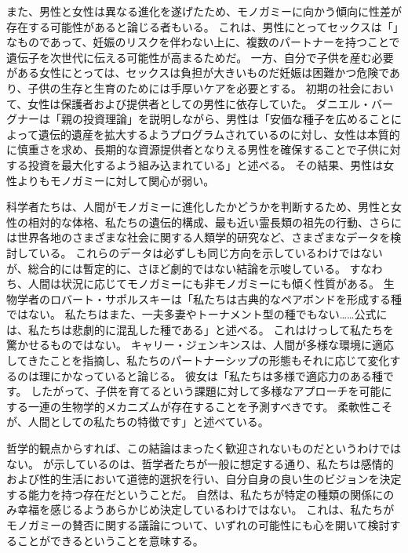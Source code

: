 \documentclass[paper=a4,book,openany]{jlreq} \usepackage{mystyle}
\begin{document}
また、男性と女性は異なる進化を遂げたため、モノガミーに向かう傾向に性差が存在する可能性があると論じる者もいる。
これは、男性にとってセックスは「」なものであって、妊娠のリスクを伴わない上に、複数のパートナーを持つことで遺伝子を次世代に伝える可能性が高まるためだ。
一方、自分で子供を産む必要がある女性にとっては、セックスは負担が大きいものだ{\DDASH}妊娠は困難かつ危険であり、子供の生存と生育のためには手厚いケアを必要とする。
初期の社会において、女性は保護者および提供者としての男性に依存していた。
ダニエル・バーグナーは「親の投資理論」を説明しながら、男性は「安価な種子を広めることによって遺伝的遺産を拡大するようプログラムされているのに対し、女性は本質的に慎重さを求め、長期的な資源提供者となりえる男性を確保することで子供に対する投資を最大化するよう組み込まれている」と述べる\citep{bergner13:_unexc}。
その結果、男性は女性よりもモノガミーに対して関心が弱い。

科学者たちは、人間がモノガミーに進化したかどうかを判断するため、男性と女性の相対的な体格、私たちの遺伝的構成、最も近い霊長類の祖先の行動、さらには世界各地のさまざまな社会に関する人類学的研究など、さまざまなデータを検討している。
これらのデータは必ずしも同じ方向を示しているわけではないが、総合的には暫定的に、さほど劇的ではない結論を示唆している。
すなわち、人間は状況に応じてモノガミーにも非モノガミーにも傾く性質がある。
生物学者のロバート・サポルスキーは「私たちは古典的なペアボンドを形成する種ではない。
私たちはまた、一夫多妻やトーナメント型の種でもない……公式には、私たちは悲劇的に混乱した種である」と述べる\citep{sapolsky25:_biolog_human_behav}。
これはけっして私たちを驚かせるものではない。
キャリー・ジェンキンスは、人間が多様な環境に適応してきたことを指摘し、私たちのパートナーシップの形態もそれに応じて変化するのは理にかなっていると論じる。
彼女は「私たちは多様で適応力のある種です。
したがって、子供を育てるという課題に対して多様なアプローチを可能にする一連の生物学的メカニズムが存在することを予測すべきです。
柔軟性こそが、人間としての私たちの特徴です」と述べている\citep{dominus17:_is_open_marriag_happier_marriag}。

哲学的観点からすれば、この結論はまったく歓迎されないものだというわけではない。
が示しているのは、哲学者たちが一般に想定する通り、私たちは感情的および性的生活において道徳的選択を行い、自分自身の良い生のビジョンを決定する能力を持つ存在だということだ。
自然は、私たちが特定の種類の関係にのみ幸福を感じるようあらかじめ決定しているわけではない。
これは、私たちがモノガミーの賛否に関する議論について、いずれの可能性にも心を開いて検討することができるということを意味する。
\end{document}
